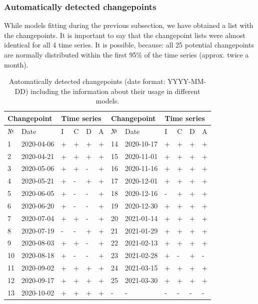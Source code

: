 \subsubsection{Automatically detected changepoints}

While models fitting during the previous subsection, we have obtained a list with the changepoints. It is important to say that the changepoint lists were almost identical for all 4 time series. It is possible, because: all 25 potential changepoints are normally distributed within the first 95\% of the time series (approx. twice a month). 

\begin{table}[!htb]
\centering
\begin{tabular}{|l|l|l|l|l|l||l|l|l|l|l|l|}
\hline
\multicolumn{2}{|l|}{Changepoint}& \multicolumn{4}{l||}{Time series} &\multicolumn{2}{l|}{Changepoint}& \multicolumn{4}{l|}{Time series} \\ \hline
№& Date & I     & C   & D   & A& № & Date & I     & C   & D   & A\\ \hline
1  & 2020-04-06 &    +    &    +    &   +     & + & 14 & 2020-10-17 &    +    &    +    &   +     & +      \\ \hline 
2  & 2020-04-21 &    +    &    +    &   +     & +  & 15 & 2020-11-01 &    +    &    +    &   +     & +      \\ \hline
3  & 2020-05-06 &    +    &    +    &   -     & +  & 16 & 2020-11-16 &    +    &    +    &   +     & +      \\ \hline
4  & 2020-05-21 &    +    &    -    &   +     & +  & 17 & 2020-12-01 &    +    &    +    &   +     & +      \\ \hline
5  & 2020-06-05 &    +    &    -    &   -     & +  & 18 & 2020-12-16 &    -    &    +    &   +     & +      \\ \hline
6  & 2020-06-20 &    +    &    -    &   -     & + &19 & 2020-12-30 &    +    &    +    &   +     & +      \\ \hline  
7  & 2020-07-04 &    +    &    +    &   -     & + &  20 & 2021-01-14 &    +    &    +    &   +     & +      \\ \hline
8  & 2020-07-19 &    -    &    -    &   +     & + & 21 & 2021-01-29 &    +    &    +    &   +     & +      \\ \hline 
9  & 2020-08-03 &    +    &    +    &   -     & + & 22 & 2021-02-13 &    +    &    +    &   +     & +      \\ \hline 
10  & 2020-08-18 &    +   &    -    &   -     & +  & 23 & 2021-02-28 &    +    &    -    &   +     & -      \\ \hline
11 & 2020-09-02 &    +    &    +    &   +     & + & 24 & 2021-03-15 &    +    &    +    &   +     & +      \\ \hline 
12 & 2020-09-17 &    +    &    +    &   +     & + & 25 & 2021-03-30 &    +    &    +    &   +     & +      \\ \hline 
13 & 2020-10-02 &    +    &    +    &   +     & + & - & - &   -   & - &  -  & - \\ \hline 
\end{tabular}
\caption{Automatically detected changepoints (date format: YYYY-MM-DD) including the information about their usage in different models.}
\label{tab:changepoints}
\end{table}
